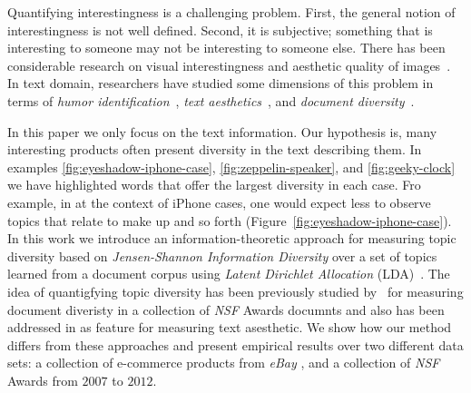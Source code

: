 \documentclass{article} %
\begin{document}
Quantifying interestingness is a challenging problem. First, the general notion of interestingness is not well defined.  Second, it is 
subjective; something that is interesting to someone may not be interesting to someone else. There has been considerable research on visual interestingness and aesthetic quality of images~\cite{Datta:2006:SAP:2129560.2129588,Ke:2006:DHF:1153170.1153495,IsolaParikhTorralbaOliva2011,dhar:2011,reinecke2013predicting,journals/pami/WeinshallZHKOABGNPHP12}. 
In text domain, researchers have studied some dimensions of this problem in terms of {\em humor identification}~\cite{Mihalcea:2005:MCL:1220575.1220642,Davidov:2010:SRS:1870568.1870582,Kiddon11,labutov-lipson:2012:ACL2012short}, {\em text aesthetics}~\cite{journals:tamd:Schmidhuber10,N13-1118,ganguly:2014}, and {\em document diversity}~\cite{bache:2013}. 

 In this paper we only focus on the text information. Our hypothesis is, many interesting products often present diversity in the text describing them. In examples \ref{fig:eyeshadow-iphone-case},
\ref{fig:zeppelin-speaker}, and \ref{fig:geeky-clock} we have highlighted words that offer the largest diversity in each case.
Fro example, in at the context of iPhone cases, one would expect less to observe topics that relate to make up and so forth
(Figure~\ref{fig:eyeshadow-iphone-case}). In this work we introduce an information-theoretic approach for measuring topic diversity based on {\em Jensen-Shannon Information Diversity} over a set of topics learned from a document corpus using {\sl Latent Dirichlet Allocation} (LDA)~\cite{Blei:2003:LDA:944919.944937}. The idea of quantigfying topic diversity has been previously studied by~\cite{bache:2013} for measuring document diveristy in a  collection of {\sl NSF} Awards documnts and also has been addressed in \cite{ganguly:2014} as  feature for measuring text asesthetic. We show how our method differs from these approaches and present empirical results over two different data sets: a collection of e-commerce products from {\sl eBay} , and a collection of {\sl NSF} Awards from $2007$ to $2012$. 

















\end{document}
